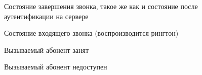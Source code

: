 \begin{figure}[h!]
\caption{Состояние завершения звонка, такое же как и состояние после аутентификации на сервере}
\label{image:test5}
\end{figure}

\begin{figure}[h!]
\caption{Состояние входящего звонка (воспроизводится рингтон)}
\label{image:test6}
\end{figure}

\begin{figure}[h!]
\caption{Вызываемый абонент занят}
\label{image:test7}
\end{figure}

\begin{figure}[h!]
\caption{Вызываемый абонент недоступен}
\label{image:test8}
\end{figure}
